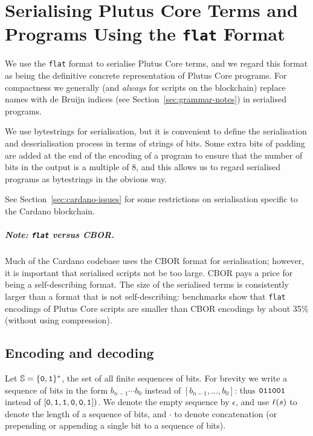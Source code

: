 \chapter{Serialising Plutus Core Terms and Programs Using the \texttt{flat} Format}
\label{appendix:flat-serialisation}
We use the \texttt{flat} format \cite{flat} to serialise Plutus Core
terms, and we regard this format as being the definitive concrete representation
of Plutus Core programs. For compactness we generally (and \textit{always} for
scripts on the blockchain) replace names with de Bruijn indices (see
Section~\ref{sec:grammar-notes}) in serialised programs.

We use bytestrings for serialisation, but it is convenient to define the
serialisation and deserialisation process in terms of strings of bits. Some
extra bits of padding are added at the end of the encoding of a program to
ensure that the number of bits in the output is a multiple of 8, and this allows
us to regard serialised programs as bytestrings in the obvious way.

See Section~\ref{sec:cardano-issues} for some restrictions on serialisation
specific to the Cardano blockchain.

\paragraph{Note: \texttt{flat} versus CBOR.}
Much of the Cardano codebase uses the CBOR format for serialisation; however, it
is important that serialised scripts not be too large. CBOR pays a price for
being a self-describing format. The size of the serialised terms is consistently
larger than a format that is not self-describing: benchmarks show that
\texttt{flat} encodings of Plutus Core scripts are smaller than CBOR encodings
by about 35\% (without using compression).



\section{Encoding and decoding}
Let $\mathbb{S} = \{\mathtt{0},\mathtt{1}\}^*$, the set of all finite sequences of
bits.  For brevity we write a sequence of bits in the form $b_{n-1} \cdots b_0$
instead of $[b_{n-1}, \ldots, b_0]$: thus $\mathtt{011001}$ instead of $[\mathtt{0},
  \mathtt{1},\mathtt{1},\mathtt{0},\mathtt{0},\mathtt{1}])$.  We denote the empty sequence
by $\epsilon$, and use $\operatorname{\ell}(s)$ to denote the length of a sequence of bits,
and $\cdot$ to denote concatenation (or prepending or appending a single bit to
a sequence of bits).%

